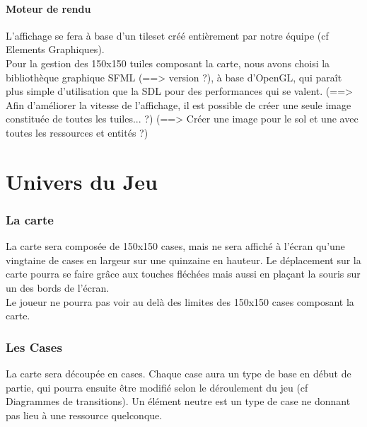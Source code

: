 \documentclass[a4paper]{article}
\begin{document}
        \subsection{Moteur de rendu}
          L'affichage se fera à base d'un tileset créé entièrement par notre équipe (cf Elements Graphiques).\\
          Pour la gestion des 150x150 tuiles composant la carte, nous avons choisi la bibliothèque graphique SFML (==> version ?), à base d'OpenGL, qui paraît plus simple d'utilisation que la SDL pour des performances qui se valent.
          (==> Afin d'améliorer la vitesse de l'affichage, il est possible de créer une seule image constituée de toutes les tuiles... ?)
          (==> Créer une image pour le sol et une avec toutes les ressources et entités ?)



  \part{Univers du Jeu}
    \section{La carte}

      La carte sera composée de 150x150 cases, mais ne sera affiché à l'écran qu'une vingtaine de cases en largeur sur une quinzaine en hauteur. Le déplacement sur la carte pourra se faire grâce aux touches fléchées mais aussi en plaçant la souris sur un des bords de l'écran.\\
      Le joueur ne pourra pas voir au delà des limites des 150x150 cases composant la carte.

    \section{Les Cases}

      La carte sera découpée en cases. Chaque case aura un type de base en début de partie, qui pourra ensuite être modifié selon le déroulement du jeu (cf Diagrammes de transitions). Un élément neutre est un type de case ne donnant pas lieu à une ressource quelconque.
\end{document}
